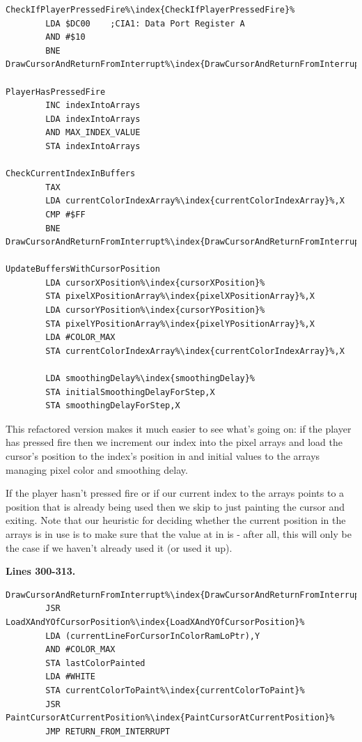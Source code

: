 \begin{lstlisting}[basicstyle=\ttfamily\scriptsize,escapechar=\%]
CheckIfPlayerPressedFire%\index{CheckIfPlayerPressedFire}%   
        LDA $DC00    ;CIA1: Data Port Register A
        AND #$10
        BNE DrawCursorAndReturnFromInterrupt%\index{DrawCursorAndReturnFromInterrupt}%

PlayerHasPressedFire
        INC indexIntoArrays
        LDA indexIntoArrays
        AND MAX_INDEX_VALUE
        STA indexIntoArrays

CheckCurrentIndexInBuffers  
        TAX 
        LDA currentColorIndexArray%\index{currentColorIndexArray}%,X
        CMP #$FF
        BNE DrawCursorAndReturnFromInterrupt%\index{DrawCursorAndReturnFromInterrupt}%

UpdateBuffersWithCursorPosition
        LDA cursorXPosition%\index{cursorXPosition}%
        STA pixelXPositionArray%\index{pixelXPositionArray}%,X
        LDA cursorYPosition%\index{cursorYPosition}%
        STA pixelYPositionArray%\index{pixelYPositionArray}%,X
        LDA #COLOR_MAX
        STA currentColorIndexArray%\index{currentColorIndexArray}%,X

        LDA smoothingDelay%\index{smoothingDelay}%
        STA initialSmoothingDelayForStep,X
        STA smoothingDelayForStep,X
\end{lstlisting}

This refactored version makes it much easier to see what's going on: if the player has pressed fire then we increment
our index into the pixel arrays and load the cursor's position to the index's position in 
and initial values to the arrays managing pixel color and smoothing delay.

If the player hasn't pressed fire or if our current index to the arrays points to a position that is already being used then
we skip to just painting the cursor and exiting. Note that our heuristic for deciding whether the current position in the 
arrays is in use is to make sure that the value at  in  is  - 
after all, this will only be the case if we haven't already used it (or used it up).

\clearpage
\textbf{Lines 300-313. }
\begin{lstlisting}[caption = Paint the cursor and call the system default interrupt handler \icode{RETURN\_FROM\_INTERRUPT},escapechar=\%]
DrawCursorAndReturnFromInterrupt%\index{DrawCursorAndReturnFromInterrupt}%   
        JSR LoadXAndYOfCursorPosition%\index{LoadXAndYOfCursorPosition}%
        LDA (currentLineForCursorInColorRamLoPtr),Y
        AND #COLOR_MAX
        STA lastColorPainted
        LDA #WHITE
        STA currentColorToPaint%\index{currentColorToPaint}%
        JSR PaintCursorAtCurrentPosition%\index{PaintCursorAtCurrentPosition}%
        JMP RETURN_FROM_INTERRUPT

\end{lstlisting}

